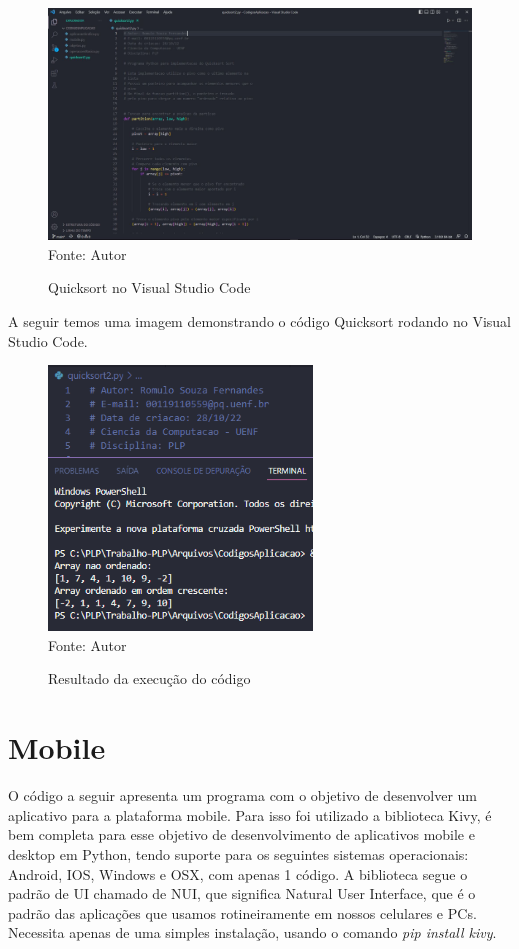 \begin{figure}[H]
	\begin{center}
		\caption{Quicksort no Visual Studio Code} \label{ling1}
		\includegraphics[width=15cm]{quickcode.JPG} \\
		{\tiny \sf Fonte:{ Autor}}
	\end{center}
\end{figure}

	A seguir temos uma imagem demonstrando o código Quicksort rodando no Visual Studio Code.
	\begin{figure}[H]
		\begin{center}
			\caption{Resultado da execução do código} \label{ling1}
			\includegraphics[width=7cm]{quick.PNG} \\
			{\tiny \sf Fonte:{ Autor}}
		\end{center}
	\end{figure}


    \section{Mobile}
    O código a seguir apresenta um programa com o objetivo de desenvolver um aplicativo para a plataforma mobile. Para isso foi utilizado a biblioteca Kivy, é bem completa para esse objetivo de desenvolvimento de aplicativos mobile e desktop em Python, tendo suporte para os seguintes sistemas operacionais: Android, IOS, Windows e OSX, com apenas 1 código. A biblioteca segue o padrão de UI chamado de NUI, que significa Natural User Interface, que é o padrão das aplicações que usamos rotineiramente em nossos celulares e PCs. Necessita apenas de uma simples instalação, usando o comando \textit{pip install kivy}.

